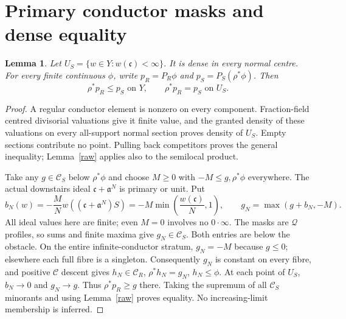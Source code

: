 \documentclass[11pt]{article}
\newtheorem{lemma}[theorem]{Lemma}
\newcommand{\C}{\mathcal C}
\newcommand{\Q}{\mathcal Q}
\newcommand{\aideal}{\mathfrak a}
\newcommand{\cond}{\mathfrak c}
\begin{document}
\section{Primary conductor masks and dense equality}
\begin{lemma}\label{mask}
Let $U_S=\{w\in Y:w(\cond)<\infty\}$. It is dense in every normal centre.
For every finite continuous $\phi$, write $p_R=P_R\phi$ and
$p_S=P_S(\rho^*\phi)$. Then
\[
 \rho^*p_R\le p_S\text{ on }Y,\qquad \rho^*p_R=p_S\text{ on }U_S.
\]
\end{lemma}
\begin{proof}
A regular conductor element is nonzero on every component. Fraction-field
centred divisorial valuations give it finite value, and the granted density
of these valuations on every all-support normal section proves density of
$U_S$. Empty sections contribute no point. Pulling back competitors proves
the general inequality; Lemma~\ref{raw} applies also to the semilocal product.

Take any $g\in\C_S$ below $\rho^*\phi$ and choose $M\ge0$ with
$-M\le g,\rho^*\phi$ everywhere. The actual downstairs ideal
$\cond+\aideal^N$ is primary or unit. Put
\[
 b_N(w)=-\frac MN w((\cond+\aideal^N)S)
       =-M\min\left(\frac{w(\cond)}N,1\right),\qquad
 g_N=\max(g+b_N,-M).
\]
All ideal values here are finite; even $M=0$ involves no $0\cdot\infty$.
The masks are $\Q$ profiles, so sums and finite maxima give $g_N\in\C_S$.
Both entries are below the obstacle. On the entire infinite-conductor stratum,
$g_N=-M$ because $g\le0$; elsewhere each full fibre is a singleton.
Consequently $g_N$ is constant on every fibre, and positive $\C$ descent
gives $h_N\in\C_R$, $\rho^*h_N=g_N$, $h_N\le\phi$.
At each point of $U_S$, $b_N\to0$ and $g_N\to g$. Thus
$\rho^*p_R\ge g$ there. Taking the supremum of all $\C_S$ minorants and using
Lemma~\ref{raw} proves equality. No increasing-limit membership is inferred.
\end{proof}
\end{document}
